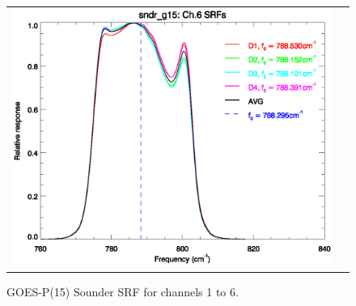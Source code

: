 \begin{figure}[htp]
\begin{tabular}{c c}
    \includegraphics[scale=0.5]{graphics/nominal/sndr_g15.ch6.srf.eps}
  \end{tabular}
  \caption{GOES-P(15) Sounder SRF for channels 1 to 6.}
  \label{fig:sndr_g15.ch1-6}
\end{figure}

